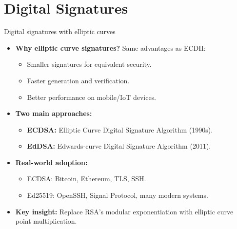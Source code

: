 \documentclass[aspectratio=169, lualatex, handout]{beamer}
\begin{document}
\section{Digital Signatures}
\begin{frame}{Digital signatures with elliptic curves}
	\begin{itemize}[<+->]
		\item \textbf{Why elliptic curve signatures?} Same advantages as ECDH:
		      \begin{itemize}
			      \item Smaller signatures for equivalent security.
			      \item Faster generation and verification.
			      \item Better performance on mobile/IoT devices.
		      \end{itemize}
		\item \textbf{Two main approaches:}
		      \begin{itemize}
			      \item \textbf{ECDSA:} Elliptic Curve Digital Signature Algorithm (1990s).
			      \item \textbf{EdDSA:} Edwards-curve Digital Signature Algorithm (2011).
		      \end{itemize}
		\item \textbf{Real-world adoption:}
		      \begin{itemize}
			      \item ECDSA: Bitcoin, Ethereum, TLS, SSH.
			      \item Ed25519: OpenSSH, Signal Protocol, many modern systems.
		      \end{itemize}
		\item \textbf{Key insight:} Replace RSA's modular exponentiation with elliptic curve point multiplication.
	\end{itemize}
\end{frame}
\end{document}
